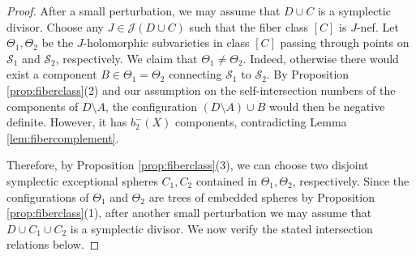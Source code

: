 \documentclass[11pt]{article}
\theoremstyle{definition}
\theoremstyle{remark}
\newcommand{\st}{\mathcal{S}}
\begin{document}
\begin{proof}
  After a small perturbation, we may assume that $D\cup C$ is a symplectic divisor. Choose any $J\in \mathcal{J}(D\cup C)$ such that the fiber class $[C]$ is $J$-nef. Let $\Theta_1,\Theta_2$ be the $J$-holomorphic subvarieties in class $[C]$ passing through points on $\st_1$ and $\st_2$, respectively. We claim that $\Theta_1\neq \Theta_2$. Indeed, otherwise there would exist a component $B\in \Theta_1=\Theta_2$ connecting $\st_1$ to $\st_2$. By Proposition \ref{prop:fiberclass}(2) and our assumption on the self-intersection numbers of the components of $D\setminus A$, the configuration $(D\setminus A)\cup B$ would then be negative definite. However, it has $b_2^-(X)$ components, contradicting Lemma \ref{lem:fibercomplement}.

  Therefore, by Proposition \ref{prop:fiberclass}(3), we can choose two disjoint symplectic exceptional spheres $C_1,C_2$ contained in $\Theta_1,\Theta_2$, respectively. Since the configurations of $\Theta_1$ and $\Theta_2$ are trees of embedded spheres by Proposition \ref{prop:fiberclass}(1), after another small perturbation we may assume that $D\cup C_1\cup C_2$ is a symplectic divisor. We now verify the stated intersection relations below.
  

\end{proof}
\end{document}
